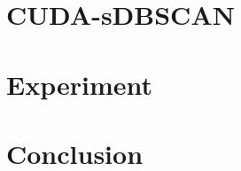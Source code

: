 \documentclass{article}
\begin{document}

\section{CUDA-sDBSCAN}

\section{Experiment}

\section{Conclusion}



\end{document}
